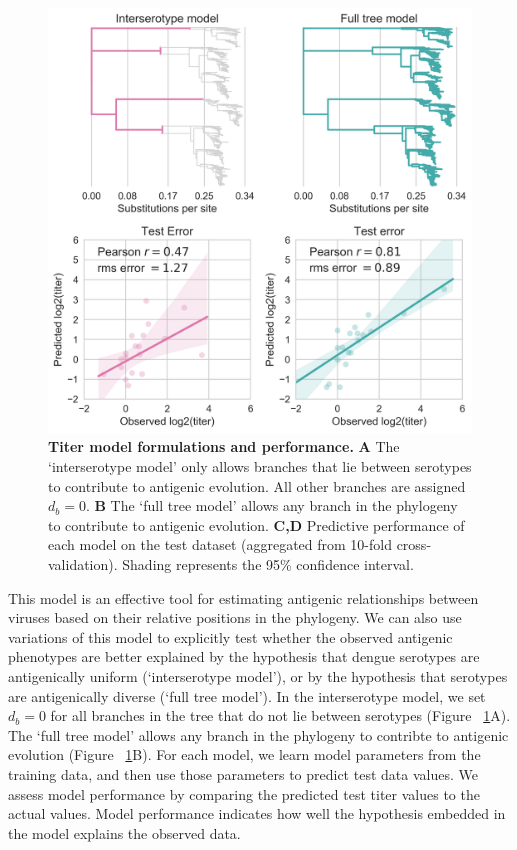 \documentclass[11pt,oneside,letterpaper]{article}
\begin{document}
\begin{figure}[h]
  \begin{centering}
    \includegraphics[width=.8\textwidth]{../figures/png/titer_model_performance.png}
        \caption{\textbf{Titer model formulations and performance.}  \textbf{A} The `interserotype model' only allows branches that lie between serotypes to contribute to antigenic evolution. All other branches are assigned $d_b = 0$. \textbf{B} The `full tree model' allows any branch in the phylogeny to contribute to antigenic evolution. \textbf{C,D} Predictive performance of each model on the test dataset (aggregated from 10-fold cross-validation). Shading represents the 95\% confidence interval.}
         \label{titer_model_performance}
  \end{centering}
\end{figure}

This model is an effective tool for estimating antigenic relationships between viruses based on their relative positions in the phylogeny.
We can also use variations of this model to explicitly test whether the observed antigenic phenotypes are better explained by the hypothesis that dengue serotypes are antigenically uniform (`interserotype model'), or by the hypothesis that serotypes are antigenically diverse (`full tree model').
In the interserotype model, we set $d_b = 0$ for all branches in the tree that do not lie between serotypes (Figure ~\ref{titer_model_performance}A).
The `full tree model' allows any branch in the phylogeny to contribte to antigenic evolution (Figure ~\ref{titer_model_performance}B).
For each model, we learn model parameters from the training data, and then use those parameters to predict test data values.
We assess model performance by comparing the predicted test titer values to the actual values.
Model performance indicates how well the hypothesis embedded in the model explains the observed data.
\end{document}
